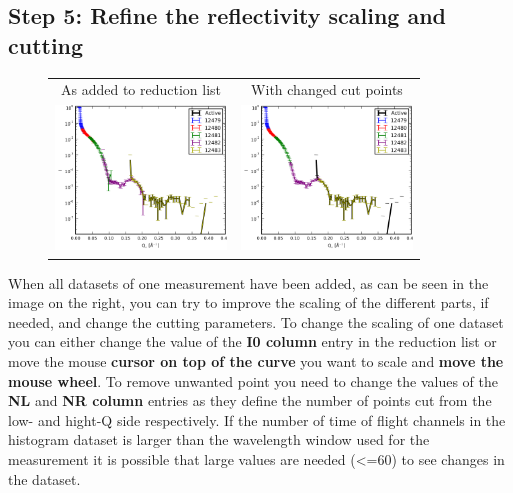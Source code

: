   \subsection{Step 5: Refine the reflectivity scaling and cutting}
  \label{sec:scaling}
    \begin{figure}
    \centering
    \begin{tabular}{cc}
       As added to reduction list& With changed cut points\\
     \includegraphics[width=129pt]{screenshots/stitching2.png} &
     \includegraphics[width=129pt]{screenshots/cleanpoints.png} 
    \end{tabular}
    \end{figure}
    When all datasets of one measurement have been added, as can be seen in the image on the right, you can try to improve the scaling of the different parts, if needed, and change the cutting parameters.
    To change the scaling of one dataset you can either change the value of the \textbf{I0 column} entry in the reduction list or move the mouse \textbf{cursor on top of the curve} you want to scale and \textbf{move the mouse wheel}.
    To remove unwanted point you need to change the values of the \textbf{NL} and \textbf{NR column} entries as they define the number of points cut from the low- and hight-Q side respectively.
    If the number of time of flight channels in the histogram dataset is larger than the wavelength window used for the measurement it is possible that large values are needed (<=60) to see changes in the dataset.
    
